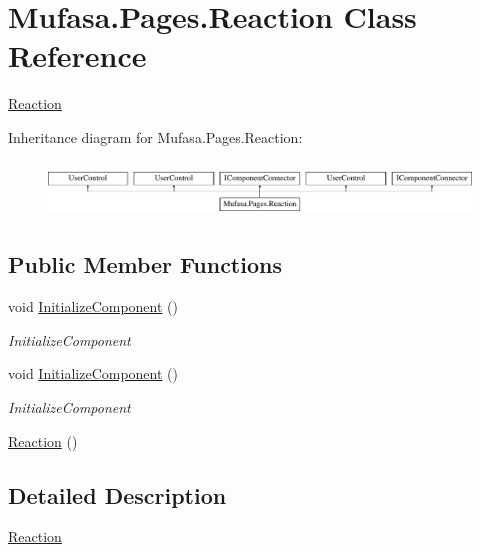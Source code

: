 \hypertarget{class_mufasa_1_1_pages_1_1_reaction}{\section{Mufasa.\+Pages.\+Reaction Class Reference}
\label{class_mufasa_1_1_pages_1_1_reaction}
}


\hyperlink{class_mufasa_1_1_pages_1_1_reaction}{Reaction}  


Inheritance diagram for Mufasa.\+Pages.\+Reaction\+:\begin{figure}[H]
\begin{center}
\leavevmode
\includegraphics[height=1.454545cm]{class_mufasa_1_1_pages_1_1_reaction}
\end{center}
\end{figure}
\subsection*{Public Member Functions}
\begin{DoxyCompactItemize}
\item 
void \hyperlink{class_mufasa_1_1_pages_1_1_reaction_a0203f4fc272b7da8e61646e337ad270b}{Initialize\+Component} ()
\begin{DoxyCompactList}\small\item\em Initialize\+Component \end{DoxyCompactList}\item 
void \hyperlink{class_mufasa_1_1_pages_1_1_reaction_a0203f4fc272b7da8e61646e337ad270b}{Initialize\+Component} ()
\begin{DoxyCompactList}\small\item\em Initialize\+Component \end{DoxyCompactList}\item 
\hyperlink{class_mufasa_1_1_pages_1_1_reaction_ae7656aa4b7df6b27160d230b705a5763}{Reaction} ()
\end{DoxyCompactItemize}


\subsection{Detailed Description}
\hyperlink{class_mufasa_1_1_pages_1_1_reaction}{Reaction} 

